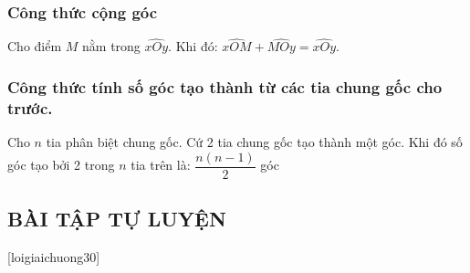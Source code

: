 \subsubsection{Công thức cộng góc}
Cho điểm $M$ nằm trong $\widehat{xOy}$. Khi đó: $\widehat{xOM}+\widehat{MOy}=\widehat{xOy}$.
\subsubsection{Công thức tính số góc tạo thành từ các tia chung gốc cho trước.}
Cho $n$ tia phân biệt chung gốc. Cứ 2 tia chung gốc tạo thành một góc. Khi đó số góc tạo bởi 2 trong $n$ tia trên là: $\dfrac{n(n-1)}{2}$ góc
\subsection{BÀI TẬP TỰ LUYỆN}
[loigiaichuong30]
